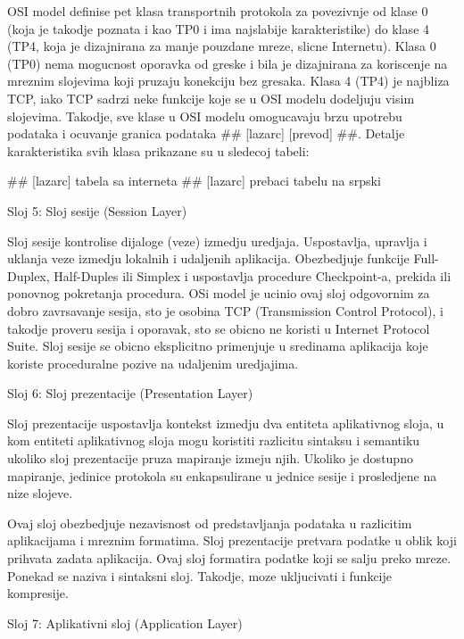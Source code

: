 \documentclass[a4paper,12pt, master]{etf}
\begin{document}
	OSI model definise pet klasa transportnih protokola za povezivnje od klase 0 (koja je takodje
	poznata i kao TP0 i ima najslabije karakteristike) do klase 4 (TP4, koja je dizajnirana za
	manje pouzdane mreze, slicne Internetu). Klasa 0 (TP0) nema mogucnost oporavka od greske i bila
	je dizajnirana za koriscenje na mreznim slojevima koji pruzaju konekciju bez gresaka. Klasa 4
	(TP4) je najbliza TCP, iako TCP sadrzi neke funkcije koje se u OSI modelu dodeljuju visim
	slojevima. Takodje, sve klase u OSI modelu omogucavaju brzu upotrebu podataka i ocuvanje
	granica podataka \#\# [lazarc] [prevod] \#\#. Detalje karakteristika svih klasa prikazane su u
	sledecoj tabeli:

	\#\# [lazarc] tabela sa interneta
	\#\# [lazarc] prebaci tabelu na srpski

	Sloj 5: Sloj sesije (Session Layer)

	Sloj sesije kontrolise dijaloge (veze) izmedju uredjaja. Uspostavlja, upravlja i uklanja veze
	izmedju lokalnih i udaljenih aplikacija. Obezbedjuje funkcije Full-Duplex, Half-Duples ili
	Simplex i uspostavlja procedure Checkpoint-a, prekida ili ponovnog pokretanja procedura. OSi
	model je ucinio ovaj sloj odgovornim za dobro zavrsavanje sesija, sto je osobina TCP
	(Transmission Control Protocol), i takodje proveru sesija i oporavak, sto se obicno ne koristi
	u Internet Protocol Suite. Sloj sesije se obicno eksplicitno primenjuje u sredinama aplikacija
	koje koriste proceduralne pozive na udaljenim uredjajima.

	Sloj 6: Sloj prezentacije (Presentation Layer)

	Sloj prezentacije uspostavlja kontekst izmedju dva entiteta aplikativnog sloja, u kom entiteti
	aplikativnog sloja mogu koristiti razlicitu sintaksu i semantiku ukoliko sloj prezentacije
	pruza mapiranje izmeju njih. Ukoliko je dostupno mapiranje, jedinice protokola su enkapsulirane
	u jednice sesije i prosledjene na nize slojeve.

	Ovaj sloj obezbedjuje nezavisnost od predstavljanja podataka u razlicitim aplikacijama i
	mreznim formatima. Sloj prezentacije pretvara podatke u oblik koji prihvata zadata aplikacija.
	Ovaj sloj formatira podatke koji se salju preko mreze. Ponekad se naziva i sintaksni sloj.
	Takodje, moze ukljucivati i funkcije kompresije.

	Sloj 7: Aplikativni sloj (Application Layer)
\end{document}
